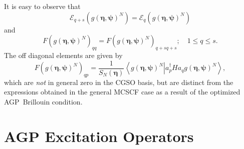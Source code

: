 \documentclass[aps,preprint]{revtex4}%
\begin{document}
It is easy to observe that
\begin{equation}
\mathcal{E}_{q+s}\left(  g\left(  \mathbf{\eta},\mathbf{\psi}\right)
^{N}\right)  =\mathcal{E}_{q}\left(  g\left(  \mathbf{\eta},\mathbf{\psi
}\right)  ^{N}\right)
\end{equation}
and
\begin{equation}
F\left(  g\left(  \mathbf{\eta},\mathbf{\psi}\right)  ^{N}\right)
_{qq}=F\left(  g\left(  \mathbf{\eta},\mathbf{\psi}\right)  ^{N}\right)
_{q+sq+s};\quad1\leq q\leq s.
\end{equation}
The off diagonal elements are given by
\begin{equation}
F\left(  g\left(  \mathbf{\eta},\mathbf{\psi}\right)  ^{N}\right)  _{qp}%
=\frac{1}{S_{N}\left(  \mathbf{\eta}\right)  }\left\langle \left.  g\left(
\mathbf{\eta},\mathbf{\psi}\right)  ^{N}\right\vert a_{p}^{\dagger}%
Ha_{q}g\left(  \mathbf{\eta},\mathbf{\psi}\right)  ^{N}\right\rangle ,
\end{equation}
which are \emph{not }in general zero in the CGSO basis, but are distinct from
the expressions obtained in the general MCSCF case as a result of the
optimized AGP\ Brillouin condition.

\section{AGP Excitation Operators\label{q_op}}
\end{document}
